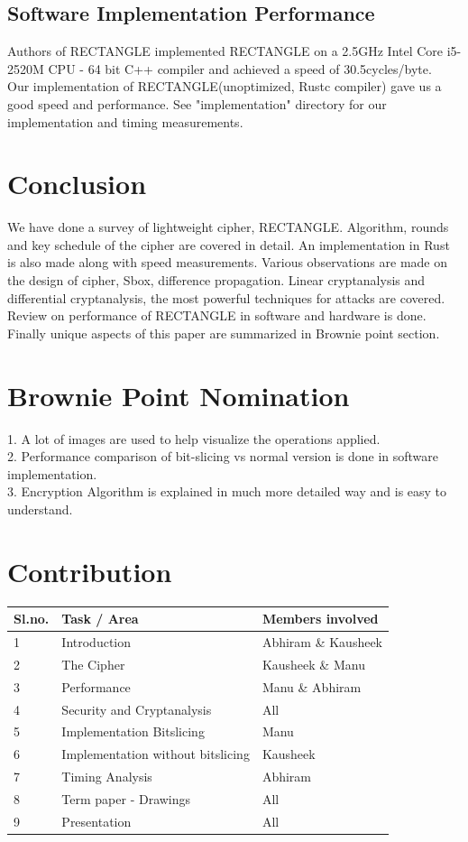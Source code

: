 \documentclass[final]{transcrypto}
\begin{document}
\subsection{Software Implementation Performance}
Authors of RECTANGLE implemented RECTANGLE on a 2.5GHz Intel Core i5-2520M CPU - 64 bit C++ compiler and achieved a speed of 30.5cycles/byte.\cite{rectangle}\\
Our implementation of RECTANGLE(unoptimized, Rustc compiler) gave us a good speed and performance. See "implementation" directory for our implementation and timing measurements.
\section{Conclusion}
We have done a survey of lightweight cipher, RECTANGLE. Algorithm, rounds and key schedule of the cipher are covered in detail. An implementation in Rust is also made along with speed measurements. Various observations are made on the design of cipher, Sbox, difference propagation. Linear cryptanalysis and differential cryptanalysis, the most powerful techniques for attacks are covered. Review on performance of RECTANGLE in software and hardware is done. Finally unique aspects of this paper are summarized in Brownie point section.
\section{Brownie Point Nomination}
1. A lot of images are used to help visualize the operations applied.\\
2. Performance comparison of bit-slicing vs normal version is done in software implementation.\\
3. Encryption Algorithm is explained in much more detailed way and is easy to understand.\\
\section{Contribution}
\begin{center}
\begin{tabular}{ |l|l|l| } 
 \hline
   Sl.no. & Task / Area & Members involved\\ \hline \hline
   1& Introduction& Abhiram \& Kausheek\\\hline
   2& The Cipher & Kausheek \& Manu\\\hline
   3& Performance & Manu \& Abhiram \\\hline
   4& Security and Cryptanalysis & All \\\hline
   5& Implementation Bitslicing & Manu \\\hline
   6& Implementation without bitslicing & Kausheek \\\hline
   7& Timing Analysis & Abhiram \\\hline
   8& Term paper - Drawings& All\\\hline
   9&Presentation& All\\ \hline

\end{tabular}
\end{center}
\end{document}
